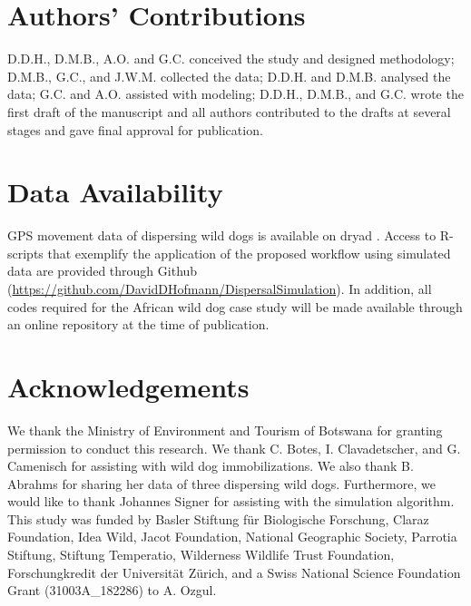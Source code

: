\documentclass[abstract=on,10pt,a4paper,bibliography=totocnumbered]{article}
\begin{document}
\section{Authors' Contributions}
D.D.H., D.M.B., A.O. and G.C. conceived the study and designed methodology;
D.M.B., G.C., and J.W.M. collected the data; D.D.H. and D.M.B. analysed the
data; G.C. and A.O. assisted with modeling; D.D.H., D.M.B., and G.C. wrote the
first draft of the manuscript and all authors contributed to the drafts at
several stages and gave final approval for publication.

\section{Data Availability}
GPS movement data of dispersing wild dogs is available on dryad
\citep{Hofmann.2021b}. Access to R-scripts that exemplify the application of the
proposed workflow using simulated data are provided through Github
(\url{https://github.com/DavidDHofmann/DispersalSimulation}). In addition, all
codes required for the African wild dog case study will be made available
through an online repository at the time of publication.

\section{Acknowledgements}
We thank the Ministry of Environment and Tourism of Botswana for granting
permission to conduct this research. We thank C. Botes, I. Clavadetscher, and G.
Camenisch for assisting with wild dog immobilizations. We also thank B. Abrahms
for sharing her data of three dispersing wild dogs. Furthermore, we would like
to thank Johannes Signer for assisting with the simulation algorithm. This study
was funded by Basler Stiftung für Biologische Forschung, Claraz Foundation, Idea
Wild, Jacot Foundation, National Geographic Society, Parrotia Stiftung, Stiftung
Temperatio, Wilderness Wildlife Trust Foundation, Forschungkredit der
Universität Zürich, and a Swiss National Science Foundation Grant
(31003A\_182286) to A. Ozgul.

\newpage
\begingroup
\singlespacing

\endgroup
\end{document}
